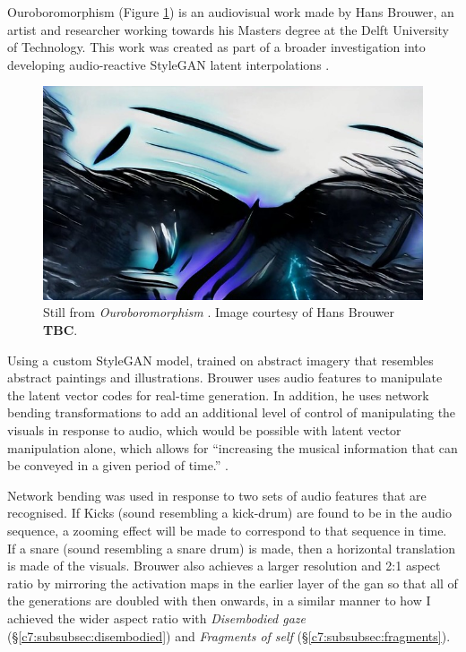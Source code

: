 Ouroboromorphism \citep{brouwer2020ourobo} (Figure \ref{fig:c7:ouroboromorphism}) is an audiovisual work made by Hans Brouwer, an artist and researcher working towards his Masters degree at the Delft University of Technology. 
This work was created as part of a broader investigation into developing audio-reactive StyleGAN latent interpolations \citep{brouwer2020audio}. 

\begin{figure}[!htb]
    \centering
    \captionsetup{justification=centering}
    \includegraphics[width=1\textwidth]{figures/c7_impact/other-artworks/Ouroboromorphism.png}
    \caption[Still from \textit{Ouroboromorphism}]{Still from \textit{Ouroboromorphism} \citep{brouwer2020ourobo}. Image courtesy of Hans Brouwer \textbf{TBC}.}
    \label{fig:c7:ouroboromorphism}
\end{figure}


Using a custom StyleGAN model, trained on abstract imagery that resembles abstract paintings and illustrations.
 Brouwer uses audio features to manipulate the latent vector codes for real-time generation. 
 In addition, he uses network bending transformations to add an additional level of control of manipulating the visuals in response to audio, which would be possible with latent vector manipulation alone, which allows for “increasing the musical information that can be conveyed in a given period of time.” \citep{brouwer2020audio}. 

Network bending was used in response to two sets of audio features that are recognised.
If Kicks (sound resembling a kick-drum) are found to be in the audio sequence, a zooming effect will be made to correspond to that sequence in time. If a snare (sound resembling a snare drum) is made, then a horizontal translation is made of the visuals. 
Brouwer also achieves a larger resolution and 2:1 aspect ratio by mirroring the activation maps in the earlier layer of the gan so that all of the generations are doubled with then onwards, in a similar manner to how I achieved the wider aspect ratio with \textit{Disembodied gaze} (\S \ref{c7:subsubsec:disembodied}) and \textit{Fragments of self} (\S \ref{c7:subsubsec:fragments}). 

